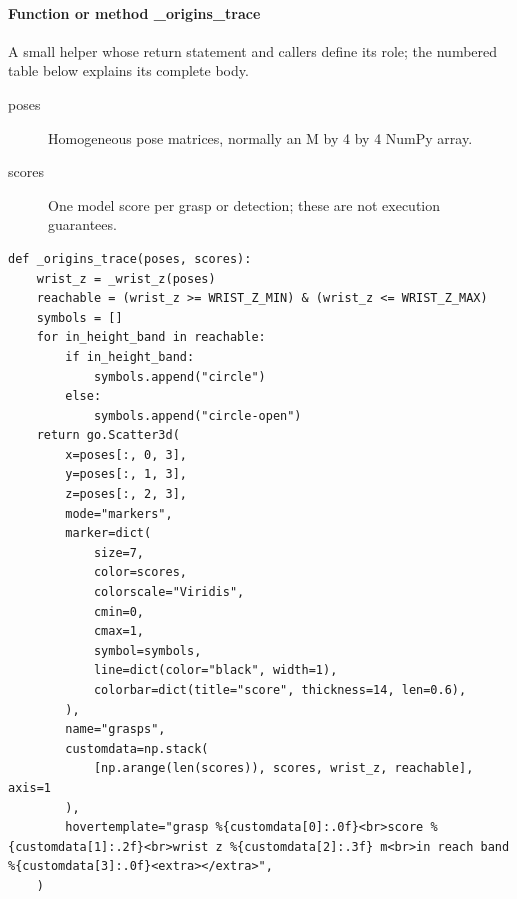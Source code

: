 \documentclass[11pt,a4paper]{book}
\begin{document}
\paragraph{Function or method \_origins\_trace}
A small helper whose return statement and callers define its role; the numbered table below explains its complete body.

\begin{description}
\item[poses] Homogeneous pose matrices, normally an M by 4 by 4 NumPy array.
\item[scores] One model score per grasp or detection; these are not execution guarantees.
\end{description}

\begin{lstlisting}[firstnumber=97]
def _origins_trace(poses, scores):
    wrist_z = _wrist_z(poses)
    reachable = (wrist_z >= WRIST_Z_MIN) & (wrist_z <= WRIST_Z_MAX)
    symbols = []
    for in_height_band in reachable:
        if in_height_band:
            symbols.append("circle")
        else:
            symbols.append("circle-open")
    return go.Scatter3d(
        x=poses[:, 0, 3],
        y=poses[:, 1, 3],
        z=poses[:, 2, 3],
        mode="markers",
        marker=dict(
            size=7,
            color=scores,
            colorscale="Viridis",
            cmin=0,
            cmax=1,
            symbol=symbols,
            line=dict(color="black", width=1),
            colorbar=dict(title="score", thickness=14, len=0.6),
        ),
        name="grasps",
        customdata=np.stack(
            [np.arange(len(scores)), scores, wrist_z, reachable], axis=1
        ),
        hovertemplate="grasp %{customdata[0]:.0f}<br>score %{customdata[1]:.2f}<br>wrist z %{customdata[2]:.3f} m<br>in reach band %{customdata[3]:.0f}<extra></extra>",
    )


\end{lstlisting}
\end{document}
